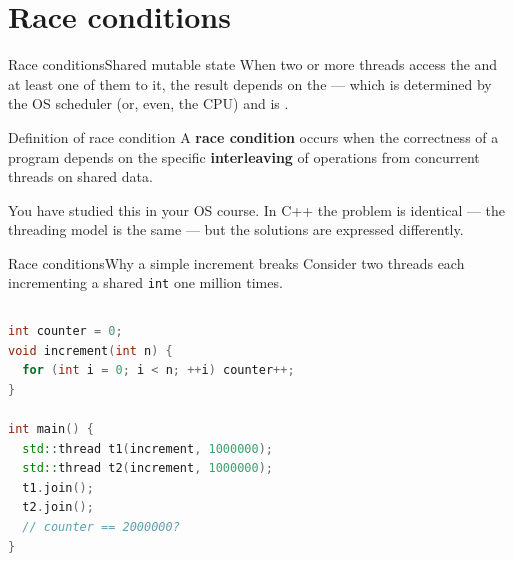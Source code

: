 
\section{Race conditions}
\graphicspath{{figs/section3/}}

\begin{frame}{Race conditions}{Shared mutable state}
	\justifying
	When two or more threads access the  and at least one of them  to it, the result depends on the  — which is determined by the OS scheduler (or, even, the CPU) and is .\\
	\bigskip
	\begin{block}{Definition of race condition}
		A \textbf{race condition} occurs when the correctness of a program depends on the specific \textbf{interleaving} of operations from concurrent threads on shared data.
	\end{block}
	\bigskip
	You have studied this in your OS course. In C++ the problem is identical — the threading model is the same — but the solutions are expressed differently.
\end{frame}
\begin{frame}[fragile]{Race conditions}{Why a simple increment breaks}
	\justifying
	Consider two threads each incrementing a shared \texttt{int} one million times.
	\begin{columns}
		\begin{lstlisting}[style=codebeamer, language=C++, caption=A racy increment — result will be wrong.]
int counter = 0;
void increment(int n) {
  for (int i = 0; i < n; ++i) counter++;
}

int main() {
  std::thread t1(increment, 1000000);
  std::thread t2(increment, 1000000);
  t1.join();
  t2.join();
  // counter == 2000000?
}
    \end{lstlisting}
	\end{columns}
\end{frame}
